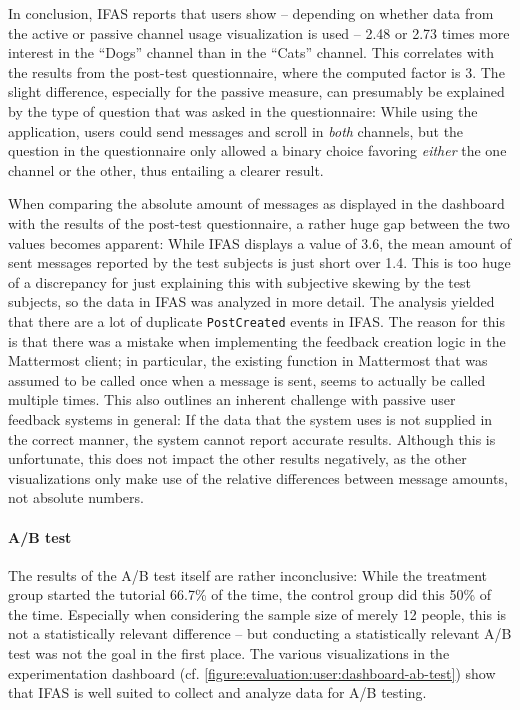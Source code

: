 In conclusion, \ac{IFAS} reports that users show -- depending on whether data from the active or passive channel usage visualization is used -- 2.48 or 2.73 times more interest in the ``Dogs'' channel than in the ``Cats'' channel.
This correlates with the results from the post-test questionnaire, where the computed factor is 3.
The slight difference, especially for the passive measure, can presumably be explained by the type of question that was asked in the questionnaire:
While using the application, users could send messages and scroll in \emph{both} channels, but the question in the questionnaire only allowed a binary choice favoring \emph{either} the one channel or the other, thus entailing a clearer result.

When comparing the absolute amount of messages as displayed in the dashboard with the results of the post-test questionnaire, a rather huge gap between the two values becomes apparent:
While \ac{IFAS} displays a value of 3.6, the mean amount of sent messages reported by the test subjects is just short over 1.4.
This is too huge of a discrepancy for just explaining this with subjective skewing by the test subjects, so the data in \ac{IFAS} was analyzed in more detail.
The analysis yielded that there are a lot of duplicate \texttt{PostCreated} events in \ac{IFAS}.
The reason for this is that there was a mistake when implementing the feedback creation logic in the Mattermost client; in particular, the existing function in Mattermost that was assumed to be called once when a message is sent, seems to actually be called multiple times.
This also outlines an inherent challenge with passive user feedback systems in general: If the data that the system uses is not supplied in the correct manner, the system cannot report accurate results.
Although this is unfortunate, this does not impact the other results negatively, as the other visualizations only make use of the relative differences between message amounts, not absolute numbers.

\FloatBarrier

\paragraph{A/B test}

The results of the A/B test itself are rather inconclusive: While the treatment group started the tutorial 66.7\% of the time, the control group did this 50\% of the time.
Especially when considering the sample size of merely 12 people, this is not a statistically relevant difference -- but conducting a statistically relevant A/B test was not the goal in the first place.
The various visualizations in the experimentation dashboard (cf. \cref{figure:evaluation:user:dashboard-ab-test}) show that \ac{IFAS} is well suited to collect and analyze data for A/B testing.

